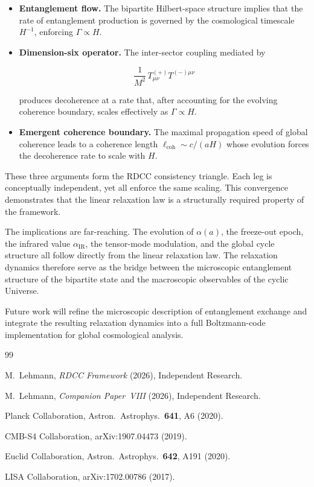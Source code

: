 \documentclass[11pt,a4paper]{article}
\begin{document}
\begin{itemize}
    \item \textbf{Entanglement flow.}
    The bipartite Hilbert-space structure implies that the rate of entanglement
    production is governed by the cosmological timescale $H^{-1}$, enforcing
    $\Gamma \propto H$.

    \item \textbf{Dimension-six operator.}
    The inter-sector coupling mediated by
    

\[
        \frac{1}{M^{2}}\, T^{(+)}_{\mu\nu} T^{(-)\mu\nu}
    \]


    produces decoherence at a rate that, after accounting for the evolving coherence
    boundary, scales effectively as $\Gamma \propto H$.

    \item \textbf{Emergent coherence boundary.}
    The maximal propagation speed of global coherence leads to a coherence length
    $\ell_{\mathrm{coh}} \sim c/(aH)$ whose evolution forces the decoherence rate to scale
    with $H$.
\end{itemize}

These three arguments form the RDCC consistency triangle. Each leg is conceptually
independent, yet all enforce the same scaling. This convergence demonstrates that the
linear relaxation law is a structurally required property of the framework.

The implications are far-reaching. The evolution of $\alpha(a)$, the freeze-out epoch,
the infrared value $\alpha_{\mathrm{IR}}$, the tensor-mode modulation, and the global cycle
structure all follow directly from the linear relaxation law. The relaxation dynamics
therefore serve as the bridge between the microscopic entanglement structure of the
bipartite state and the macroscopic observables of the cyclic Universe.

Future work will refine the microscopic description of entanglement exchange and
integrate the resulting relaxation dynamics into a full Boltzmann-code implementation
for global cosmological analysis.

\begin{thebibliography}{99}

M.~Lehmann,
\textit{RDCC Framework} (2026), Independent Research.

M.~Lehmann,
\textit{Companion Paper~VIII} (2026), Independent Research.

Planck Collaboration,
Astron.\ Astrophys.\ \textbf{641}, A6 (2020).

CMB-S4 Collaboration,
arXiv:1907.04473 (2019).

Euclid Collaboration,
Astron.\ Astrophys.\ \textbf{642}, A191 (2020).

LISA Collaboration,
arXiv:1702.00786 (2017).

\end{thebibliography}
\end{document}
